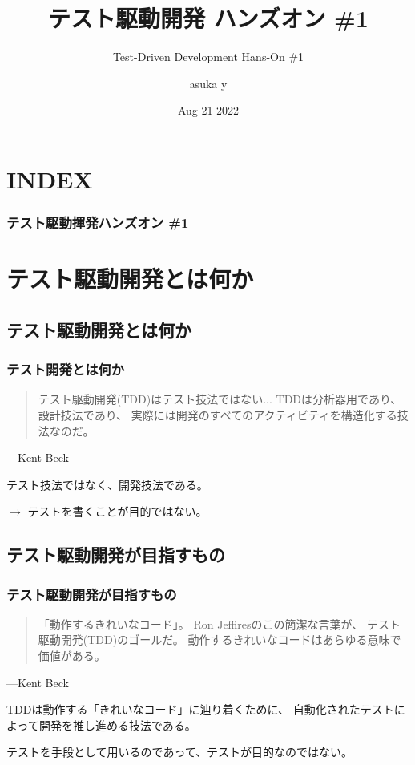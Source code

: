 \documentclass[aspectratio=169]{beamer}
\title{テスト駆動開発 ハンズオン \#1}
\subtitle{Test-Driven Development Hans-On \#1}
\author{asuka y}
\date{Aug 21 2022}
\begin{document}
\begin{frame}
  \titlepage
\end{frame}

\section*{INDEX}
\begin{frame}
  \frametitle{テスト駆動揮発ハンズオン \#1}
  \tableofcontents
\end{frame}

\section{テスト駆動開発とは何か}
\subsection{テスト駆動開発とは何か}
\begin{frame}\frametitle{テスト開発とは何か}
  \begin{quote}
    テスト駆動開発(TDD)はテスト技法ではない...
    TDDは分析器用であり、設計技法であり、
    実際には開発のすべてのアクティビティを構造化する技法なのだ。
  \end{quote}
  \begin{flushright}
    ---Kent Beck
  \end{flushright}

  テスト技法ではなく、開発技法である。

  {
    \large \color{blue}
    $\rightarrow$
    テストを書くことが目的ではない。
  }
\end{frame}

\subsection{テスト駆動開発が目指すもの}
\begin{frame}\frametitle{テスト駆動開発が目指すもの}
  \begin{quote}
    「動作するきれいなコード」。
    Ron Jeffiresのこの簡潔な言葉が、
    テスト駆動開発(TDD)のゴールだ。
    動作するきれいなコードはあらゆる意味で価値がある。
  \end{quote}
  \begin{flushright}
    ---Kent Beck
  \end{flushright}

  TDDは動作する「きれいなコード」に辿り着くために、
  {\color{blue} 自動化されたテストによって開発を推し進める技法}である。

  \begin{center}
    \color{red} \large テストを手段として用いるのであって、テストが目的なのではない。
  \end{center}
\end{frame}
\end{document}
